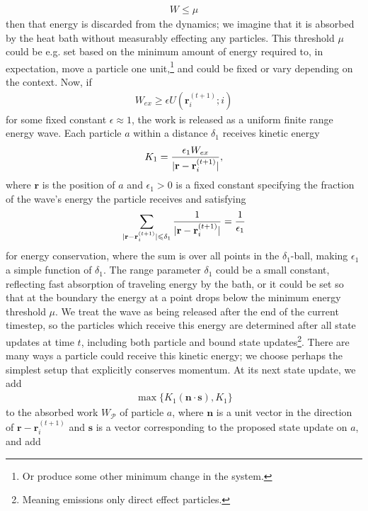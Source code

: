 \documentclass[12pt,letterpaper]{article}
\newcommand{\mb}{\mathbf}
\newcommand{\mc}{\mathcal}
\begin{document}
\begin{itemize}
\begin{align*}
W \leqslant \mu
\end{align*}
then that energy is discarded from the dynamics; we imagine that it is absorbed by the heat bath without measurably effecting any particles. This threshold $\mu$ could be e.g. set based on the minimum amount of energy required to, in expectation, move a particle one unit,\footnote{Or produce some other minimum change in the system.} and could be fixed or vary depending on the context. Now, if %
\begin{align*}
W_{ex} \geqslant \epsilon U(\mb{r}^{(t+1)}_{i}; i)
\end{align*}
for some fixed constant $\epsilon \approx 1$, the work is released as a uniform finite range energy wave. Each particle $a$ within a distance $\delta_{1}$ receives kinetic energy
\begin{align*}
K_{1} = {\epsilon_{1}W_{ex} \over |\mb{r} - \mb{r}_{i}^{(t+1)}|},
\end{align*}
where $\mb{r}$ is the position of $a$ and $\epsilon_{1} > 0$ is a fixed constant specifying the fraction of the wave's energy the particle receives and satisfying %
\begin{align*}
\sum_{|\mb{r} - \mb{r}_{i}^{(t+1)}| \leqslant \delta_{1}}{1 \over |\mb{r} - \mb{r}_{i}^{(t+1)}|} = {1 \over \epsilon_{1}}
\end{align*}
for energy conservation, where the sum is over all points in the $\delta_{1}$-ball, making $\epsilon_{1}$ a simple function of $\delta_{1}$. The range parameter $\delta_{1}$ could be a small constant, reflecting fast absorption of traveling energy by the bath, or it could be set so that at the boundary the energy at a point drops below the minimum energy threshold $\mu$. We treat the wave as being released after the end of the current timestep, so the particles which receive this energy are determined after all state updates at time $t$, including both particle and bound state updates\footnote{Meaning emissions only direct effect particles.}. There are many ways a particle could receive this kinetic energy; we choose perhaps the simplest setup that explicitly conserves momentum. At its next state update, we add
\begin{align*}
\max\{K_{1}(\mb{n} \cdot \mb{s}), K_{1}\}
\end{align*}
to the absorbed work $W_{\mc{P}}$ of particle $a$, where $\mb{n}$ is a unit vector in the direction of $\mb{r} - \mb{r}_{i}^{(t+1)}$ and $\mb{s}$ is a vector corresponding to the proposed state update on $a$, and add

\end{itemize}
\end{document}
